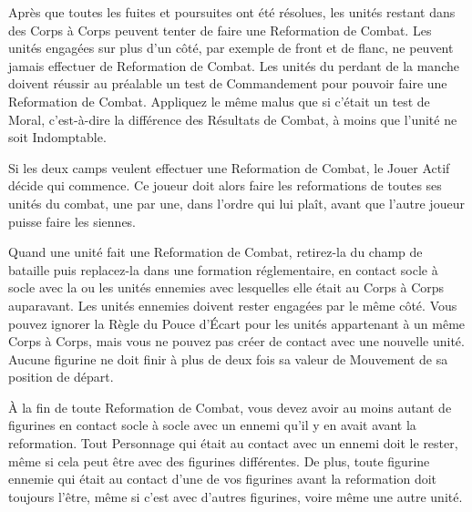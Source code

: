 Après que toutes les fuites et poursuites ont été résolues, les unités restant dans des Corps à Corps peuvent tenter de faire une Reformation de Combat. Les unités engagées sur plus d'un côté, par exemple de front et de flanc, ne peuvent jamais effectuer de Reformation de Combat. Les unités du perdant de la manche doivent réussir au préalable un test de Commandement pour pouvoir faire une Reformation de Combat. Appliquez le même malus que si c'était un test de Moral, c'est-à-dire la différence des Résultats de Combat, à moins que l'unité ne soit Indomptable.

Si les deux camps veulent effectuer une Reformation de Combat, le Jouer Actif décide qui commence. Ce joueur doit alors faire les reformations de toutes ses unités du combat, une par une, dans l'ordre qui lui plaît, avant que l'autre joueur puisse faire les siennes.

Quand une unité fait une Reformation de Combat, retirez-la du champ de bataille puis replacez-la dans une formation réglementaire, en contact socle à socle avec la ou les unités ennemies avec lesquelles elle était au Corps à Corps auparavant. Les unités ennemies doivent rester engagées par le même côté. Vous pouvez ignorer la Règle du Pouce d'Écart pour les unités appartenant à un même Corps à Corps, mais vous ne pouvez pas créer de contact avec une nouvelle unité. Aucune figurine ne doit finir à plus de deux fois sa valeur de Mouvement de sa position de départ.

À la fin de toute Reformation de Combat, vous devez avoir au moins autant de figurines en contact socle à socle avec un ennemi qu'il y en avait avant la reformation. Tout Personnage qui était au contact avec un ennemi doit le rester, même si cela peut être avec des figurines différentes. De plus, toute figurine ennemie qui était au contact d'une de vos figurines avant la reformation doit toujours l'être, même si c'est avec d'autres figurines, voire même une autre unité.


